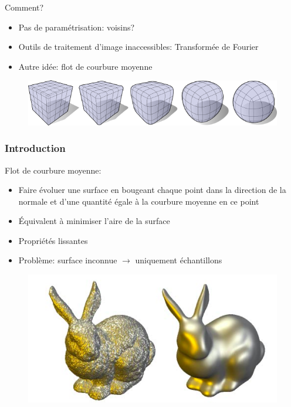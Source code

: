 \documentclass{beamer}
\begin{document}
\begin{frame}[allowframebreaks]
    \newpage
    Comment?
    \begin{itemize}
        \item Pas de paramétrisation: voisins?
        \item Outils de traitement d'image inaccessibles: Transformée de Fourier
        \item Autre idée: flot de courbure moyenne
    \end{itemize}

    \begin{figure}
        \centering
        \includegraphics[scale=0.3]{img/mean-curvature-flow-cube}
    \end{figure}
\end{frame}

\begin{frame}
    \frametitle{Introduction}

    Flot de courbure moyenne:
    \begin{itemize}
        \item Faire évoluer une surface en bougeant chaque point dans la
            direction de la normale et d'une quantité égale à la
            courbure moyenne en ce point
        \item Équivalent à minimiser l'aire de la surface
        \item Propriétés lissantes
        \item Problème: surface inconnue $ \to $ uniquement échantillons
    \end{itemize}

    \begin{figure}
        \centering
        \includegraphics[scale=0.22]{img/mean-curvature-flow-rabbit}
    \end{figure}
\end{frame}
\end{document}

